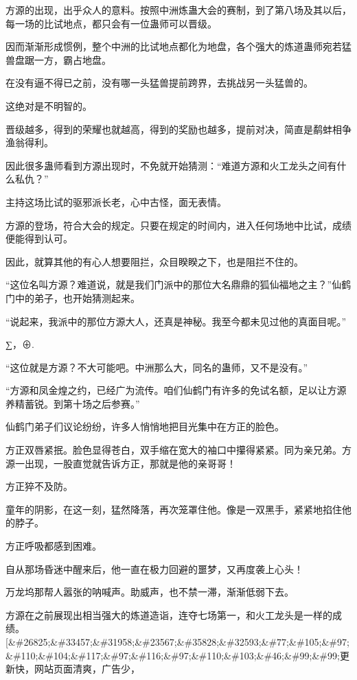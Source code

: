 
\begin{this_body}

方源的出现，出乎众人的意料。按照中洲炼蛊大会的赛制，到了第八场及其以后，每一场的比试地点，都只会有一位蛊师可以晋级。

因而渐渐形成惯例，整个中洲的比试地点都化为地盘，各个强大的炼道蛊师宛若猛兽盘踞一方，霸占地盘。

在没有逼不得已之前，没有哪一头猛兽提前跨界，去挑战另一头猛兽的。

这绝对是不明智的。

晋级越多，得到的荣耀也就越高，得到的奖励也越多，提前对决，简直是鹬蚌相争渔翁得利。

因此很多蛊师看到方源出现时，不免就开始猜测：“难道方源和火工龙头之间有什么私仇？”

主持这场比试的驱邪派长老，心中古怪，面无表情。

方源的登场，符合大会的规定。只要在规定的时间内，进入任何场地中比试，成绩便能得到认可。

因此，就算其他的有心人想要阻拦，众目睽睽之下，也是阻拦不住的。

“这位名叫方源？难道说，就是我们门派中的那位大名鼎鼎的狐仙福地之主？”仙鹤门中的弟子，也开始猜测起来。

“说起来，我派中的那位方源大人，还真是神秘。我至今都未见过他的真面目呢。”

∑，⊕.

“这位就是方源？不大可能吧。中洲那么大，同名的蛊师，又不是没有。”

“方源和凤金煌之约，已经广为流传。咱们仙鹤门有许多的免试名额，足以让方源养精蓄锐。到第十场之后参赛。”

仙鹤门弟子们议论纷纷，许多人悄悄地把目光集中在方正的脸色。

方正双唇紧抿。脸色显得苍白，双手缩在宽大的袖口中攥得紧紧。同为亲兄弟。方源一出现，一股直觉就告诉方正，那就是他的亲哥哥！

方正猝不及防。

童年的阴影，在这一刻，猛然降落，再次笼罩住他。像是一双黑手，紧紧地掐住他的脖子。

方正呼吸都感到困难。

自从那场昏迷中醒来后，他一直在极力回避的噩梦，又再度袭上心头！

万龙坞那帮人嚣张的呐喊声。助威声，也不禁一滞，渐渐低弱下去。

方源在之前展现出相当强大的炼道造诣，连夺七场第一，和火工龙头是一样的成绩。[\&\#26825;\&\#33457;\&\#31958;\&\#23567;\&\#35828;\&\#32593;\&\#77;\&\#105;\&\#97;\&\#110;\&\#104;\&\#117;\&\#97;\&\#116;\&\#97;\&\#110;\&\#103;\&\#46;\&\#99;\&\#99;更新快，网站页面清爽，广告少，


\end{this_body}
